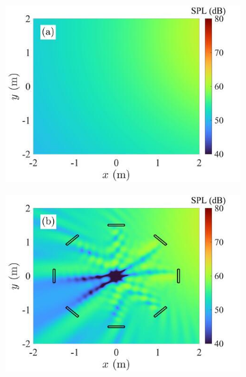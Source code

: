 \begin{figure}[!htb]
    \centering
    \begin{subfigure}{0.32\textwidth}
        \centering
        \includegraphics[width = \textwidth]{fig/cal_ANC_QuietZone_demo_pri_200503B_resize.jpg}
    \end{subfigure}
    \begin{subfigure}{0.32\textwidth}
        \centering
        \includegraphics[width = \textwidth]{fig/cal_ANC_QuietZone_demo_tot_PAL_200503B_resize.jpg}
    \end{subfigure}
    \begin{subfigure}{0.32\textwidth}
        \centering

\end{subfigure}
\end{figure}
